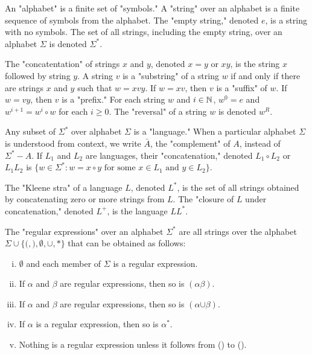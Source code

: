 \documentclass[a4paper,11pt]{article}
\begin{document}
\begin{outline}
    An "alphabet" is a finite set of "symbols." A "string" over an alphabet is a finite sequence of symbols from the
    alphabet. The "empty string," denoted \(e\), is a string with no symbols. The set of all strings, including the
    empty string, over an alphabet \(\Sigma\) is denoted \(\Sigma^*\).
    
    The "concatentation" of strings \(x\) and \(y\), denoted \(x = y\) or \(xy\), is the string \(x\) followed by
    string \(y\). A string \(v\) is a "substring" of a string \(w\) if and only if there are strings \(x\) and \(y\)
    such that \(w = xvy\). If \(w = xv\), then \(v\) is a "suffix" of \(w\). If \(w = vy\), then \(v\) is a "prefix."
    For each string \(w\) and \(i \in \mathbb{N}\), \(w^0 = e\) and \(w^{i+1} = w^i \circ w\) for each \(i \geq 0\). The
    "reversal" of a string \(w\) is denoted \(w^R\).
    
    Any subset of \(\Sigma^*\) over alphabet \(\Sigma\) is a "language." When a particular alphabet \(\Sigma\) is
    understood from context, we write \(\bar{A}\), the "complement" of \(A\), instead of \(\Sigma^*-A\). If \(L_1\)
    and \(L_2\) are languages, their "concatenation," denoted \(L_1 \circ L_2\) or \(L_1L_2\) is \(\{w \in \Sigma^*:
    w = x \circ y\text{ for some }x \in L_1\text{ and }y \in L_2\}\).
    
    The "Kleene stra" of a language \(L\), denoted \(L^*\), is the set of all strings obtained by concatenating zero
    or more strings from \(L\). The "closure of \(L\) under concatenation," denoted \(L^+\), is the language \(LL^*\).
    
    The "regular expressions" over an alphabet \(\Sigma^*\) are all strings over the alphabet \(\Sigma \cup \{\pmb{(},
    \pmb{)}, \pmb{\emptyset}, \pmb{\cup}, \pmb{*}\}\) that can be obtained as follows:
    \begin{enumerate}[i.]
      \item \(\pmb{\emptyset}\) and each member of \(\Sigma\) is a regular expression.
      \item If \(\alpha\) and \(\beta\) are regular expressions, then so is \((\alpha\beta)\).
      \item If \(\alpha\) and \(\beta\) are regular expressions, then so is \((\alpha\pmb{\cup}\beta)\).
      \item If \(\alpha\) is a regular expression, then so is \(\alpha^{\pmb{*}}\).
      \item Nothing is a regular expression unless it follows from () to ().
    \end{enumerate}
      

\end{outline}
\end{document}
